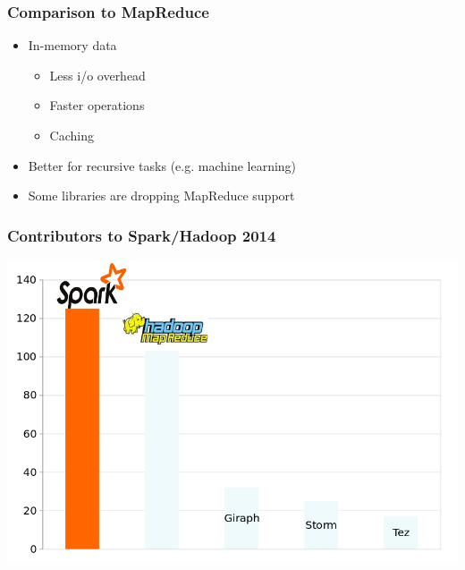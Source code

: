 \documentclass{beamer}
\begin{document}
{
  \pagecolor{white}

\begin{frame}[plain]
\end{frame}
}

\begin{frame}
\frametitle{Comparison to MapReduce}
\begin{itemize}
  \item In-memory data
    \begin{itemize}
      \item Less i/o overhead
      \item Faster operations
      \item Caching
    \end{itemize}
  \item Better for recursive tasks (e.g. machine learning)
  \item Some libraries are dropping MapReduce support
\end{itemize}
\end{frame}

  \begin{frame}
    \frametitle{Contributors to Spark/Hadoop 2014}
    \includegraphics[width=\textwidth]{images/hadoopsparkcontribs.png}
  \end{frame}
\end{document}
